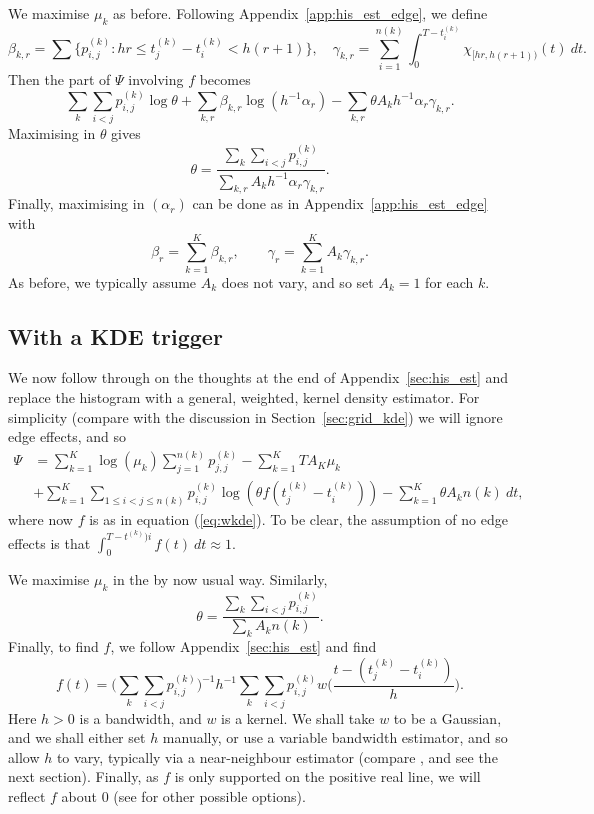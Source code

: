 \documentclass[twoside,a4paper]{article}
\theoremstyle{plain}
\theoremstyle{definition}
\begin{document}
We maximise $\mu_k$ as before.  Following Appendix~\ref{app:his_est_edge}, we define
\[ \beta_{k,r} = \sum \big\{ p^{(k)}_{i,j} : hr \leq t^{(k)}_j - t^{(k)}_i
< h(r+1) \big\}, \quad
\gamma_{k,r} = \sum_{i=1}^{n(k)} \int_0^{T-t^{(k)}_i}
\chi_{[hr,h(r+1))}(t) \ dt. \]
Then the part of $\Psi$ involving $f$ becomes
\[ \sum_k \sum_{i<j} p^{(k)}_{i,j} \log\theta
+ \sum_{k,r} \beta_{k,r} \log(h^{-1}\alpha_r)
- \sum_{k,r} \theta A_k h^{-1} \alpha_r \gamma_{k,r}. \]
Maximising in $\theta$ gives
\[ \theta = \frac{\sum_k \sum_{i<j} p^{(k)}_{i,j}}{\sum_{k,r} A_k h^{-1}\alpha_r\gamma_{k,r}}. \]
Finally, maximising in $(\alpha_r)$ can be done as in Appendix~\ref{app:his_est_edge}
with
\[ \beta_r = \sum_{k=1}^K \beta_{k,r}, 
\qquad
\gamma_r = \sum_{k=1}^K A_k \gamma_{k,r}. \]
As before, we typically assume $A_k$ does not vary, and so set $A_k=1$ for each $k$.



\subsection{With a KDE trigger}\label{app:grid_kde}

We now follow through on the thoughts at the end of Appendix~\ref{sec:his_est}
and replace the histogram with a general, weighted, kernel density estimator.
For simplicity (compare with the discussion in Section~\ref{sec:grid_kde}) we will
ignore edge effects, and so
\begin{align*}
\Psi &= \sum_{k=1}^K \log(\mu_k) \sum_{j=1}^{n(k)} p^{(k)}_{j,j}
  - \sum_{k=1}^K TA_K\mu_k \\
&+\sum_{k=1}^K \sum_{1\leq i<j\leq n(k)} p^{(k)}_{i,j} \log(\theta f(t^{(k)}_j - t^{(k)}_i))
- \sum_{k=1}^K \theta A_k n(k) \ dt,
\end{align*}
where now $f$ is as in equation (\ref{eq:wkde}).  To be clear, the assumption of
no edge effects is that $\int_0^{T-t^{(k)})i} f(t) \ dt \approx 1$.

We maximise $\mu_k$ in the by now usual way.  Similarly,
\[ \theta = \frac{\sum_k\sum_{i<j} p^{(k)}_{i,j}}{\sum_k A_k n(k)}. \]
Finally, to find $f$, we follow Appendix~\ref{sec:his_est} and find
\[ f(t) = \Big( \sum_k \sum_{i<j} p^{(k)}_{i,j} \Big)^{-1}
h^{-1} \sum_k \sum_{i<j} p^{(k)}_{i,j} w\Big( \frac{t - (t^{(k)}_j - t^{(k)}_i)}{h} \Big).
\]
Here $h>0$ is a bandwidth, and $w$ is a kernel.  We shall take $w$ to be a Gaussian, and we
shall either set $h$ manually, or use a variable bandwidth estimator, and so allow $h$ to
vary, typically via a near-neighbour estimator (compare \cite[Appendix]{sepp}, and see
the next section).
Finally, as $f$ is only supported on the positive real line, we will reflect $f$ about $0$
(see \cite[Section~2.10]{sil} for other possible options).
\end{document}
